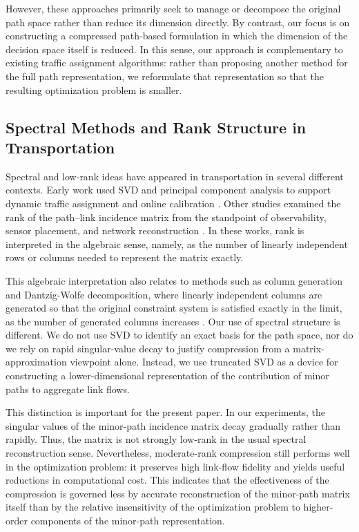 \documentclass[11pt]{article}
\begin{document}
However, these approaches primarily seek to manage or decompose the original path space rather than reduce its dimension directly. By contrast, our focus is on constructing a compressed path-based formulation in which the dimension of the decision space itself is reduced. In this sense, our approach is complementary to existing traffic assignment algorithms: rather than proposing another method for the full path representation, we reformulate that representation so that the resulting optimization problem is smaller.

\subsection{Spectral Methods and Rank Structure in Transportation}

Spectral and low-rank ideas have appeared in transportation in several different contexts. Early work used SVD and principal component analysis to support dynamic traffic assignment and online calibration \cite{peeta1999generalized, prakash2017reducing}. Other studies examined the rank of the path--link incidence matrix from the standpoint of observability, sensor placement, and network reconstruction \cite{hu2009identification, zhou2010information}. In these works, rank is interpreted in the algebraic sense, namely, as the number of linearly independent rows or columns needed to represent the matrix exactly.

This algebraic interpretation also relates to methods such as column generation and Dantzig-Wolfe decomposition, where linearly independent columns are generated so that the original constraint system is satisfied exactly in the limit, as the number of generated columns increases \cite{lubbecke2005selected, barnhart1998branch}. Our use of spectral structure is different. We do not use SVD to identify an exact basis for the path space, nor do we rely on rapid singular-value decay to justify compression from a matrix-approximation viewpoint alone. Instead, we use truncated SVD as a device for constructing a lower-dimensional representation of the contribution of minor paths to aggregate link flows.

This distinction is important for the present paper. In our experiments, the singular values of the minor-path incidence matrix decay gradually rather than rapidly. Thus, the matrix is not strongly low-rank in the usual spectral reconstruction sense. Nevertheless, moderate-rank compression still performs well in the optimization problem: it preserves high link-flow fidelity and yields useful reductions in computational cost. This indicates that the effectiveness of the compression is governed less by accurate reconstruction of the minor-path matrix itself than by the relative insensitivity of the optimization problem to higher-order components of the minor-path representation.
\end{document}

